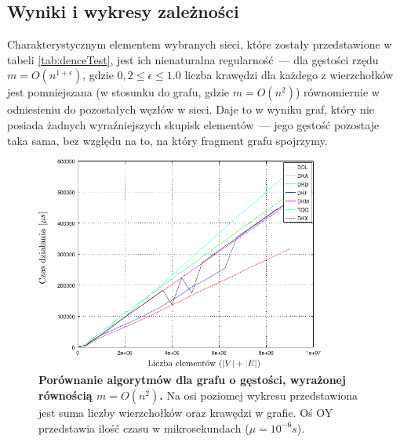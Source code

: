 \subsection{Wyniki i wykresy zależności}

Charakterystycznym elementem wybranych sieci, które zostały przedstawione w tabeli \ref{tab:denceTest}, jest ich nienaturalna regularność~--- dla gęstości rzędu $ m = O \left( n^{1+\epsilon}\right)$, gdzie $ 0,2 \leqslant \epsilon \leqslant 1.0 $ liczba krawędzi dla każdego z wierzchołków jest pomniejszana (w stosunku do grafu, gdzie  $ m = O \left( n^{2}\right)$) równomiernie w odniesieniu do pozostałych węzłów w sieci. Daje to w wyniku graf, który nie posiada żadnych wyraźniejszych skupisk elementów~--- jego gęstość pozostaje taka sama, bez względu na to, na który fragment grafu spojrzymy.

\begin{figure}[!htbp]
	\centering
	\includegraphics[width=0.85\textwidth]{Chapter_IV/fullGraph200_psfrag.pdf}
	\caption{\textbf{ Porównanie algorytmów dla grafu o gęstości, wyrażonej równością $ m = O \left( n^{2} \right)$.} Na osi poziomej wykresu przedstawiona jest suma liczby wierzchołków oraz krawędzi w grafie. Oś \textsc{OY} przedstawia ilość czasu w mikrosekundach ($\mu = 10^{-6} s$). }\label{fig:plotFullGraph_2.00}
\end{figure}

